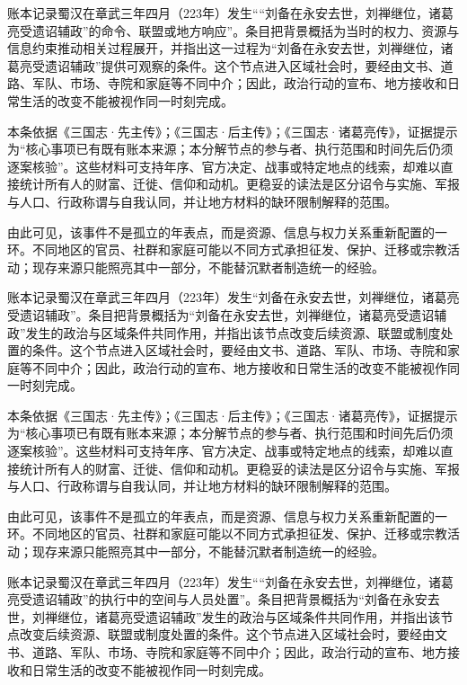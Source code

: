 账本记录蜀汉在章武三年四月（223年）发生““刘备在永安去世，刘禅继位，诸葛亮受遗诏辅政”的命令、联盟或地方响应”。条目把背景概括为当时的权力、资源与信息约束推动相关过程展开，并指出这一过程为“刘备在永安去世，刘禅继位，诸葛亮受遗诏辅政”提供可观察的条件。这个节点进入区域社会时，要经由文书、道路、军队、市场、寺院和家庭等不同中介；因此，政治行动的宣布、地方接收和日常生活的改变不能被视作同一时刻完成。

本条依据《三国志·先主传》；《三国志·后主传》；《三国志·诸葛亮传》，证据提示为“核心事项已有既有账本来源；本分解节点的参与者、执行范围和时间先后仍须逐案核验”。这些材料可支持年序、官方决定、战事或特定地点的线索，却难以直接统计所有人的财富、迁徙、信仰和动机。更稳妥的读法是区分诏令与实施、军报与人口、行政称谓与自我认同，并让地方材料的缺环限制解释的范围。

由此可见，该事件不是孤立的年表点，而是资源、信息与权力关系重新配置的一环。不同地区的官员、社群和家庭可能以不同方式承担征发、保护、迁移或宗教活动；现存来源只能照亮其中一部分，不能替沉默者制造统一的经验。

账本记录蜀汉在章武三年四月（223年）发生“刘备在永安去世，刘禅继位，诸葛亮受遗诏辅政”。条目把背景概括为“刘备在永安去世，刘禅继位，诸葛亮受遗诏辅政”发生的政治与区域条件共同作用，并指出该节点改变后续资源、联盟或制度处置的条件。这个节点进入区域社会时，要经由文书、道路、军队、市场、寺院和家庭等不同中介；因此，政治行动的宣布、地方接收和日常生活的改变不能被视作同一时刻完成。

本条依据《三国志·先主传》；《三国志·后主传》；《三国志·诸葛亮传》，证据提示为“核心事项已有既有账本来源；本分解节点的参与者、执行范围和时间先后仍须逐案核验”。这些材料可支持年序、官方决定、战事或特定地点的线索，却难以直接统计所有人的财富、迁徙、信仰和动机。更稳妥的读法是区分诏令与实施、军报与人口、行政称谓与自我认同，并让地方材料的缺环限制解释的范围。

由此可见，该事件不是孤立的年表点，而是资源、信息与权力关系重新配置的一环。不同地区的官员、社群和家庭可能以不同方式承担征发、保护、迁移或宗教活动；现存来源只能照亮其中一部分，不能替沉默者制造统一的经验。

账本记录蜀汉在章武三年四月（223年）发生““刘备在永安去世，刘禅继位，诸葛亮受遗诏辅政”的执行中的空间与人员处置”。条目把背景概括为“刘备在永安去世，刘禅继位，诸葛亮受遗诏辅政”发生的政治与区域条件共同作用，并指出该节点改变后续资源、联盟或制度处置的条件。这个节点进入区域社会时，要经由文书、道路、军队、市场、寺院和家庭等不同中介；因此，政治行动的宣布、地方接收和日常生活的改变不能被视作同一时刻完成。


